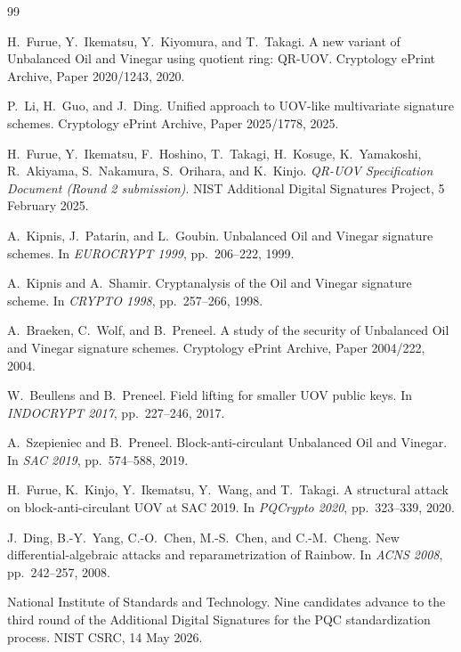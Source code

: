 \documentclass[11pt,a4paper]{article}
\theoremstyle{definition}
\theoremstyle{remark}
\begin{document}
\begin{thebibliography}{99}
\fontsize{8.5pt}{9.6pt}\selectfont
\setlength{\itemsep}{0pt}
\setlength{\parsep}{0pt}

H.~Furue, Y.~Ikematsu, Y.~Kiyomura, and T.~Takagi.
\newblock A new variant of Unbalanced Oil and Vinegar using quotient ring: QR-UOV.
\newblock Cryptology ePrint Archive, Paper 2020/1243, 2020.

P.~Li, H.~Guo, and J.~Ding.
\newblock Unified approach to UOV-like multivariate signature schemes.
\newblock Cryptology ePrint Archive, Paper 2025/1778, 2025.

H.~Furue, Y.~Ikematsu, F.~Hoshino, T.~Takagi, H.~Kosuge, K.~Yamakoshi, R.~Akiyama, S.~Nakamura, S.~Orihara, and K.~Kinjo.
\newblock \emph{QR-UOV Specification Document (Round 2 submission)}.
\newblock NIST Additional Digital Signatures Project, 5 February 2025.

A.~Kipnis, J.~Patarin, and L.~Goubin.
\newblock Unbalanced Oil and Vinegar signature schemes.
\newblock In \emph{EUROCRYPT 1999}, pp.~206--222, 1999.

A.~Kipnis and A.~Shamir.
\newblock Cryptanalysis of the Oil and Vinegar signature scheme.
\newblock In \emph{CRYPTO 1998}, pp.~257--266, 1998.

A.~Braeken, C.~Wolf, and B.~Preneel.
\newblock A study of the security of Unbalanced Oil and Vinegar signature schemes.
\newblock Cryptology ePrint Archive, Paper 2004/222, 2004.

W.~Beullens and B.~Preneel.
\newblock Field lifting for smaller UOV public keys.
\newblock In \emph{INDOCRYPT 2017}, pp.~227--246, 2017.

A.~Szepieniec and B.~Preneel.
\newblock Block-anti-circulant Unbalanced Oil and Vinegar.
\newblock In \emph{SAC 2019}, pp.~574--588, 2019.

H.~Furue, K.~Kinjo, Y.~Ikematsu, Y.~Wang, and T.~Takagi.
\newblock A structural attack on block-anti-circulant UOV at SAC 2019.
\newblock In \emph{PQCrypto 2020}, pp.~323--339, 2020.

J.~Ding, B.-Y.~Yang, C.-O.~Chen, M.-S.~Chen, and C.-M.~Cheng.
\newblock New differential-algebraic attacks and reparametrization of Rainbow.
\newblock In \emph{ACNS 2008}, pp.~242--257, 2008.

National Institute of Standards and Technology.
\newblock Nine candidates advance to the third round of the Additional Digital Signatures for the PQC standardization process.
\newblock NIST CSRC, 14 May 2026.


\end{thebibliography}
\end{document}
